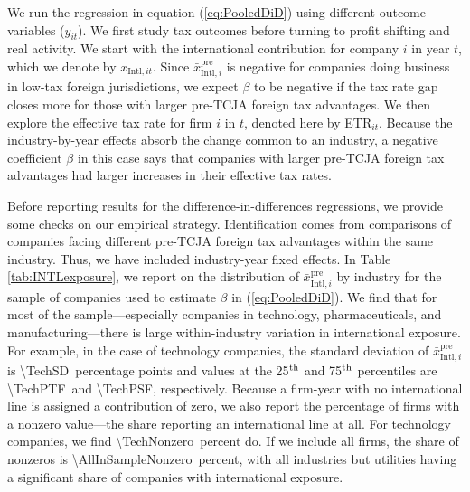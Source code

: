 \documentclass[11pt,letterpaper]{article}
\newcommand{\ShareNum}[1]{\num[round-mode=places,round-precision=1]{#1}}
\begin{document}
We run the regression in equation (\ref{eq:PooledDiD})
using different outcome variables ($y_{it}$). 
We first study tax outcomes before turning 
to profit shifting and real activity.
We start with the
international contribution for company $i$
in year $t$, which we denote by $x_{\text{Intl},it}$.
Since $\bar x^{\text{pre}}_{\text{Intl},i}$ is negative for 
companies doing business in low-tax foreign jurisdictions, we expect 
$\beta$ to be negative if the tax rate gap closes more for those 
with larger pre-TCJA foreign tax advantages.
We then explore the effective tax rate 
for firm $i$ in $t$, denoted here by ETR$_{it}$. Because the industry-by-year effects absorb the change common to an
industry, a negative coefficient $\beta$ in this case says that companies
with larger pre-TCJA foreign tax advantages had larger increases in their
effective tax rates.

Before reporting results for the difference-in-differences
regressions, we provide some checks on our empirical strategy.
Identification comes from comparisons of companies facing 
different pre-TCJA foreign tax advantages within the same industry.
Thus, we have included industry-year fixed effects.
In Table \ref{tab:INTLexposure}, we 
report on the distribution of $\bar x^{\text{pre}}_{\text{Intl},i}$ 
by industry for the sample of companies used to estimate $\beta$ in (\ref{eq:PooledDiD}).
We find that for most of the sample---especially companies in technology,
pharmaceuticals, and manufacturing---there is large within-industry variation in 
international exposure. For example, 
in the case of technology companies,
the standard deviation of 
$\bar x^{\text{pre}}_{\text{Intl},i}$ is 
\ShareNum{\TechSD}\ percentage points
and values at the 25$^{\rm th}$ and 75$^{\rm th}$ 
percentiles are
\ShareNum{\TechPTF}\  and
\ShareNum{\TechPSF}, respectively.
Because a firm-year with no international line is assigned a
contribution of zero, we also report the percentage of firms with a
nonzero value---the share reporting an international line at all.
For technology companies, we find
\ShareNum{\TechNonzero}\ percent do.
If we include all firms, the share of nonzeros is 
\ShareNum{\AllInSampleNonzero}\ percent, with all 
industries but utilities having a significant share of
companies with international exposure. 
\end{document}
